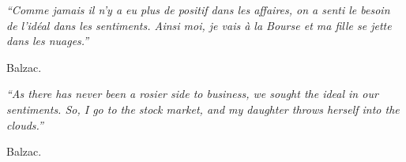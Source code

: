 \begin{flushleft}
	\textit{``Comme jamais il n’y a eu plus de positif dans les affaires, on a senti le besoin de l’idéal dans les sentiments. Ainsi moi, je vais à la Bourse et ma fille se jette dans les nuages.''}
\end{flushleft}
\begin{flushright}
	Balzac.
\end{flushright}
\begin{flushleft}
	\textit{``As there has never been a rosier side to business, we sought the ideal in our sentiments. So, I go to the stock market, and my daughter throws herself into the clouds.''}
\end{flushleft}
\begin{flushright}
	Balzac.
\end{flushright}